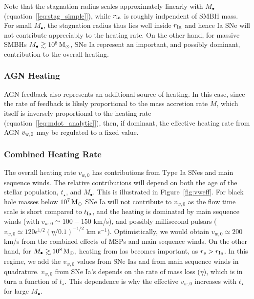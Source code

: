 \documentclass[usenatbib,fleqn]{mn2e}
\newcommand\gsim{\mathrel{\rlap{\lower4pt\hbox{\hskip1pt$\sim$}}
    \raise1pt\hbox{$>$}}}
\newcommand{\rs}{r_s}
\newcommand{\Mbh}[1][]{M_{\bullet#1}}
\newcommand{\rIa}{r_{\rm Ia}}
\newcommand{\vwO}{v_{w,0}}
\newcommand{\tage}{t_{\star}}
\begin{document}
Note that the stagnation radius scales approximately linearly with $M_{\bullet}$ (equation~[\ref{eq:stag_simple}]), while $\rIa$ is roughly indpendent of SMBH mass.  For small $\Mbh$, the stagnation radius thus lies well inside $\rIa$ and hence Ia SNe will not contribute appreciably to the heating rate.  On the other hand, for massive SMBHs $M_{\bullet} \gtrsim 10^8 \,{\rm M_\odot}$, SNe Ia  represent an important, and possibly dominant, contribution to the overall heating.

\subsubsection{AGN Heating}

AGN feedback also represents an additional source of heating.  In this case, since the rate of feedback is likely proportional to the mass accretion rate $\dot{M}$, which itself is inversely proportional to the heating rate (equation~[\ref{eq:mdot_analytic}]), then, if dominant, the effective heating rate from AGN $v_{\rm w,0}$ may be regulated to a fixed value.  

\subsubsection{Combined Heating Rate} The overall heating rate $\vwO$
has contributions from Type Ia SNes and main sequence winds.  The
relative contributions will depend on both the age of the stellar
population, $\tage$, and $\Mbh$.  This is illustrated in
Figure~\ref{fig:vweff}. For black hole masses below $10^7 \,{\rm M_\odot}$ SNe
Ia will not contribute to $\vwO$ as the flow time scale is short
compared to $t_{\rm Ia}$, and the heating is dominated by main
sequence winds (with $\vwO\simeq 100-150$ km/s), and possibly
millisecond pulsars ($\vwO\simeq 120\epsilon^{1/2} (\eta/0.1)^{-1/2}$
km s$^{-1}$).  Optimistically, we would obtain $\vwO\simeq 200$ km/s
from the combined effects of MSPs and main sequence winds. On the
other hand, for $\Mbh \gsim 10^8 \Msun$, heating from Ias becomes
important, as $\rs>\rIa$. In this regime, we add the $\vwO$ values
from SNe Ias and from main sequence winds in quadrature. $\vwO$ from
SNe Ia's depends on the rate of mass loss ($\eta$), which is in turn a
function of $t_{\star}$. This dependence is why the effective $\vwO$
increases with $\tage$ for large $\Mbh$.
\end{document}
